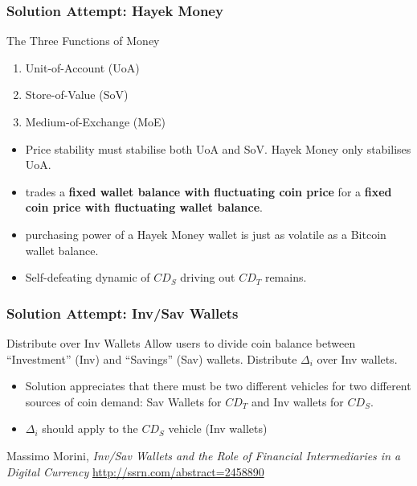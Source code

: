 \documentclass{beamer}
\begin{document}
\begin{frame}
  \frametitle{Solution Attempt: Hayek Money}

  \begin{block}{The Three Functions of Money}
    \begin{enumerate}
    \item Unit-of-Account (UoA)
    \item Store-of-Value (SoV)
    \item Medium-of-Exchange (MoE)
    \end{enumerate}
  \end{block}
  
  \begin{itemize}
  \item Price stability must stabilise both UoA and SoV. Hayek Money only
    stabilises UoA. 
  \item trades a \textbf{fixed wallet balance with fluctuating coin
      price} for a \textbf{fixed coin price with fluctuating wallet
      balance}.
  \item purchasing power of a Hayek Money wallet is just as volatile as
    a Bitcoin wallet balance.
  \item Self-defeating dynamic of $CD_{S}$ driving out $CD_{T}$ remains.
  \end{itemize}

\end{frame}

\begin{frame}
  \frametitle{Solution Attempt: Inv/Sav Wallets}

  \begin{block}{Distribute over Inv Wallets}
    Allow users to divide coin balance between ``Investment'' (Inv) and
    ``Savings'' (Sav) wallets. Distribute $\Delta_{i}$ over Inv wallets.
  \end{block}

  \begin{itemize}
  \item Solution appreciates that there must be two different vehicles
    for two different sources of coin demand: Sav Wallets for $CD_{T}$
    and Inv wallets for $CD_{S}$.
  \item $\Delta_{i}$ should apply to the $CD_{S}$ vehicle (Inv wallets)
  \end{itemize}
  
  Massimo Morini, \emph{Inv/Sav Wallets and the Role of Financial
    Intermediaries in a Digital Currency}
  \url{http://ssrn.com/abstract=2458890}

\end{frame}
  
\end{document}
